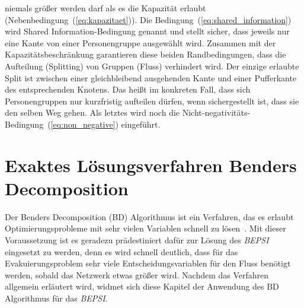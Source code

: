 \documentclass[a4paper, 11pt]{scrreprt}
\begin{document}
niemals größer werden darf als es die Kapazität erlaubt (Nebenbedingung~(\ref{eq:kapazitaet})).
Die Bedingung~(\ref{eq:shared_information}) wird Shared Information-Bedingung genannt und stellt sicher,
dass jeweils nur eine Kante von einer Personengruppe ausgewählt wird. Zusammen mit der Kapazitätsbeschränkung
garantieren diese beiden Randbedingungen, dass die Aufteilung (Splitting) von Gruppen (Fluss) verhindert wird.
Der einzige erlaubte Split ist zwischen einer gleichbleibend ausgehenden Kante und einer Pufferkante des
entsprechenden Knotens.
Das heißt im konkreten Fall, dass sich Personengruppen nur kurzfristig aufteilen dürfen, wenn
sichergestellt ist, dass sie den selben Weg gehen.
Als letztes wird noch die Nicht-negativitäts-Bedingung~(\ref{eq:non_negative}) eingeführt.



\chapter{Exaktes Lösungsverfahren Benders Decomposition}
\label{sec:bender}
Der Benders Decomposition (BD) Algorithmus ist ein Verfahren, das es erlaubt Optimierungsprobleme
mit sehr vielen Variablen schnell zu lösen~\cite{bepsi}. Mit dieser Voraussetzung ist es geradezu prädestiniert
dafür zur Lösung des \textit{BEPSI} eingesetzt zu werden, denn es wird schnell deutlich, dass für
das Evakuierungsproblem sehr viele Entscheidungsvariablen für den Fluss benötigt werden,
sobald das Netzwerk etwas größer wird.
Nachdem das Verfahren allgemein erläutert wird, widmet sich diese Kapitel der Anwendung
des BD Algorithmus für das \textit{BEPSI}.
\end{document}
